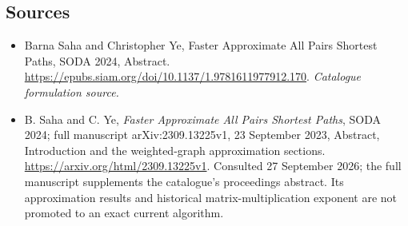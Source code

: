 \documentclass[11pt,a4paper]{article}
\numberwithin{equation}{section}
\begin{document}
\subsection{Sources}
\begin{itemize}\raggedright
\item[\textnormal{[S1]}]\hypertarget{source:30006803:1}{} Barna Saha and Christopher Ye, Faster Approximate All Pairs Shortest Paths, SODA 2024, Abstract.
\url{https://epubs.siam.org/doi/10.1137/1.9781611977912.170}.
{\small\textit{Catalogue formulation source.}}
\item[\textnormal{[E1]}]\hypertarget{extra:30006803:1}{}
B. Saha and C. Ye, \emph{Faster Approximate All Pairs Shortest Paths},
SODA 2024; full manuscript arXiv:2309.13225v1, 23 September 2023,
Abstract, Introduction and the weighted-graph approximation sections.
\url{https://arxiv.org/html/2309.13225v1}.
Consulted 27 September 2026; the full manuscript supplements the
catalogue's proceedings abstract. Its approximation results and
historical matrix-multiplication exponent are not promoted to an exact
current algorithm.
\end{itemize}
\end{document}
